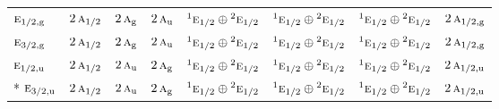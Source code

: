 \documentclass[10pt,a4paper]{article}
\numberwithin{equation}{section}
\newcommand{\irr}[1]{\text{\normalfont\scshape #1}}
\newcommand{\conjpair}[1]{{}^{#1}}
\newcommand{\ptag}[1]{\mathrm{#1}}
\begin{document}
{\begin{longtable}{@{}lccccccc@{}}
$\irr{e}_{1/2,\ptag{g}}$ & $2\,\irr{a}_{1/2}$ & $2\,\irr{a}_{\ptag{g}}$ & $2\,\irr{a}_{\ptag{u}}$ & $\conjpair{1}\irr{e}_{1/2}\oplus \conjpair{2}\irr{e}_{1/2}$ & $\conjpair{1}\irr{e}_{1/2}\oplus \conjpair{2}\irr{e}_{1/2}$ & $\conjpair{1}\irr{e}_{1/2}\oplus \conjpair{2}\irr{e}_{1/2}$ & $2\,\irr{a}_{1/2,\ptag{g}}$\\
$\irr{e}_{3/2,\ptag{g}}$ & $2\,\irr{a}_{1/2}$ & $2\,\irr{a}_{\ptag{g}}$ & $2\,\irr{a}_{\ptag{u}}$ & $\conjpair{1}\irr{e}_{1/2}\oplus \conjpair{2}\irr{e}_{1/2}$ & $\conjpair{1}\irr{e}_{1/2}\oplus \conjpair{2}\irr{e}_{1/2}$ & $\conjpair{1}\irr{e}_{1/2}\oplus \conjpair{2}\irr{e}_{1/2}$ & $2\,\irr{a}_{1/2,\ptag{g}}$\\
$\irr{e}_{1/2,\ptag{u}}$ & $2\,\irr{a}_{1/2}$ & $2\,\irr{a}_{\ptag{u}}$ & $2\,\irr{a}_{\ptag{g}}$ & $\conjpair{1}\irr{e}_{1/2}\oplus \conjpair{2}\irr{e}_{1/2}$ & $\conjpair{1}\irr{e}_{1/2}\oplus \conjpair{2}\irr{e}_{1/2}$ & $\conjpair{1}\irr{e}_{1/2}\oplus \conjpair{2}\irr{e}_{1/2}$ & $2\,\irr{a}_{1/2,\ptag{u}}$\\*
$\irr{e}_{3/2,\ptag{u}}$ & $2\,\irr{a}_{1/2}$ & $2\,\irr{a}_{\ptag{u}}$ & $2\,\irr{a}_{\ptag{g}}$ & $\conjpair{1}\irr{e}_{1/2}\oplus \conjpair{2}\irr{e}_{1/2}$ & $\conjpair{1}\irr{e}_{1/2}\oplus \conjpair{2}\irr{e}_{1/2}$ & $\conjpair{1}\irr{e}_{1/2}\oplus \conjpair{2}\irr{e}_{1/2}$ & $2\,\irr{a}_{1/2,\ptag{u}}$\\
\bottomrule\end{longtable}}
\end{document}
